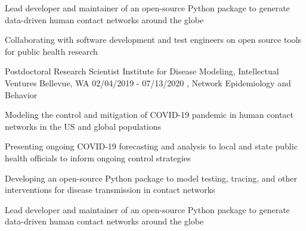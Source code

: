 \begin{cventries}
{\begin{cvitems}
        \item {Lead developer and maintainer of an open-source Python package to generate data-driven human contact networks around the globe 
        }
        \item {Collaborating with software development and test engineers on open source tools for public health research}
      \end{cvitems}     
    }
\vspace{-0.5mm}
\begin{cventries}
  \cventryfour
    {Postdoctoral Research Scientist} %
    {Institute for Disease Modeling, Intellectual Ventures} %
    {Bellevue, WA} %
    {02/04/2019 - 07/13/2020} %
    {, Network Epidemiology and Behavior} %
    {
      \begin{cvitems} %
        \item {Modeling the control and mitigation of COVID-19 pandemic in human contact networks in the US and global populations}
        \item {Presenting ongoing COVID-19 forecasting and analysis to local and state public health officials to inform ongoing control strategies}
        \item {Developing an open-source Python package to model testing, tracing, and other interventions for disease transmission in contact networks}
        \item {Lead developer and maintainer of an open-source Python package to generate data-driven human contact networks around the globe 
}
\end{cvitems}}
\end{cventries}
\end{cventries}

